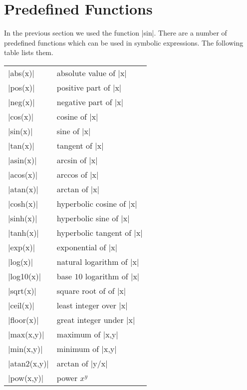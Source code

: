 \documentclass[12pt]{article}
\newcommand{\NUMBER}[1]{\ensuremath{#1}}
\renewcommand{\verb}{\SaveVerb[aftersave=\texttt{\color{red}\UseVerb{verb}}]{verb}}
\begin{document}
\section{Predefined Functions}
In the previous section we used the function \verb|sin|. There are a number of
predefined functions which can be used in symbolic expressions. The following
table lists them.
\begin{center}
  \begin{tabular}{|l|l|}
    \hline
    \verb|abs(x)|     &   absolute value of \verb|x| \\
    \verb|pos(x)|     &   positive part of \verb|x| \\
    \verb|neg(x)|     &   negative part of \verb|x| \\
    \verb|cos(x)|     &   cosine of \verb|x| \\
    \verb|sin(x)|     &   sine of \verb|x| \\
    \verb|tan(x)|     &   tangent of \verb|x| \\
    \verb|asin(x)|    &   arcsin of \verb|x| \\
    \verb|acos(x)|    &   arccos of \verb|x| \\
    \verb|atan(x)|    &   arctan of \verb|x| \\
    \verb|cosh(x)|    &   hyperbolic cosine of \verb|x| \\
    \verb|sinh(x)|    &   hyperbolic sine of \verb|x| \\
    \verb|tanh(x)|    &   hyperbolic tangent of \verb|x| \\
    \verb|exp(x)|     &   exponential of \verb|x| \\
    \verb|log(x)|     &   natural logarithm of \verb|x| \\
    \verb|log10(x)|   &   base \NUMBER{10} logarithm of \verb|x| \\
    \verb|sqrt(x)|    &   square root of of \verb|x| \\
    \verb|ceil(x)|    &   least integer over \verb|x| \\
    \verb|floor(x)|   &   great integer under \verb|x| \\
    \hline
    \verb|max(x,y)|   &   maximum of \verb|{x,y}| \\
    \verb|min(x,y)|   &   minimum of \verb|{x,y}| \\
    \verb|atan2(x,y)| &   arctan of \verb|y/x| \\
    \verb|pow(x,y)|   &   power $x^{y}$ \\
    \hline
  \end{tabular}
\end{center}
\end{document}
